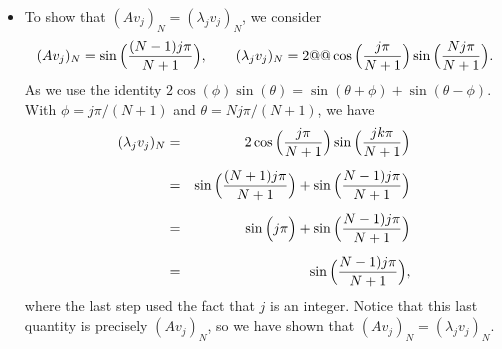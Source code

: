 {\begin{solution}
\begin{enumerate}
\begin{itemize}
\item To show that $(Av_j)_N = (\lambda_j v_j)_N$, we consider
\[ (Av_j)_N =  \sin\Big({(N-1)j\pi\over N+1}\Big), \qquad
   (\lambda_j v_j)_N =  2@@\cos\Big({j \pi \over N+1}\Big)\sin\Big({Nj\pi\over N+1}\Big).\]
As we use the identity $2 \cos(\phi)\sin(\theta) = \sin(\theta+\phi)+\sin(\theta-\phi)$. 
With $\phi = j\pi/(N+1)$ and $\theta = Nj \pi/(N+1)$, we have
\begin{eqnarray*}
  (\lambda_j v_j)_N &=& 2\cos\Big({j\pi\over N+1}\Big) \sin\Big({jk\pi\over N+1}\Big) \\[.5em]
     &=& \sin\Big({(N+1)j \pi \over N+1} \Big)+\sin\Big({N-1)j\pi \over N+1}\Big) \\[.5em]
     &=& \sin\Big(j \pi\Big)+\sin\Big({N-1)j\pi \over N+1}\Big) \\[.5em]
     &=& \sin\Big({N-1)j\pi \over N+1}\Big),
\end{eqnarray*}
where the last step used the fact that $j$ is an integer.  Notice that this last quantity is
precisely $(Av_j)_N$, so we have shown that $(Av_j)_N = (\lambda_j v_j)_N$.  
\end{itemize}

\end{enumerate}
\end{solution}}
